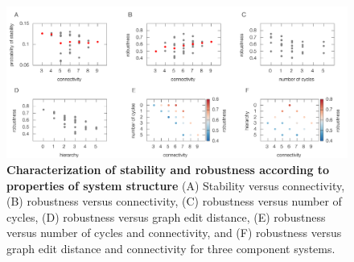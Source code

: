 \pagebreak

\begin{figure}[!ht]
\centering
\noindent\includegraphics[width=1.0\columnwidth]{fig/combinedfigs.pdf}
\caption{{\bf Characterization of stability and robustness according to properties of system structure} (A) Stability versus connectivity, (B) robustness versus connectivity, (C) robustness versus number of cycles, (D) robustness versus graph edit distance, (E) robustness versus number of cycles and connectivity, and (F) robustness versus graph edit distance and connectivity for three component systems.}
\label{fig:combined}
\end{figure}





